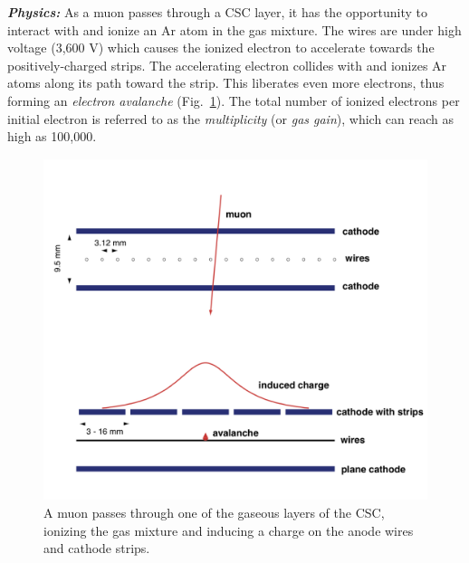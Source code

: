 \textit{\textbf{Physics:}}
As a muon passes through a CSC layer, it has the opportunity to interact with and ionize an Ar atom in the gas mixture.
The wires are under high voltage (3,600 V) which causes the ionized electron to accelerate towards the positively-charged strips.
The accelerating electron collides with and ionizes Ar atoms along its path toward the strip.
This liberates even more electrons, thus forming an \emph{electron avalanche} (Fig.~\ref{fig:elec_avalanche}).
The total number of ionized electrons per initial electron is referred to as the \emph{multiplicity} (or \emph{gas gain}), which can reach as high as 100,000.
\begin{figure}[pbth]
\centering
\includegraphics[width=15cm,height=10cm,keepaspectratio]{figures/cms/muonsys/csc_elec_avalanche_old.png}
    \caption{
    A muon passes through one of the gaseous layers of the CSC, ionizing the gas mixture and inducing a charge on the anode wires and cathode strips. 
    }
    \label{fig:elec_avalanche}
\end{figure}

